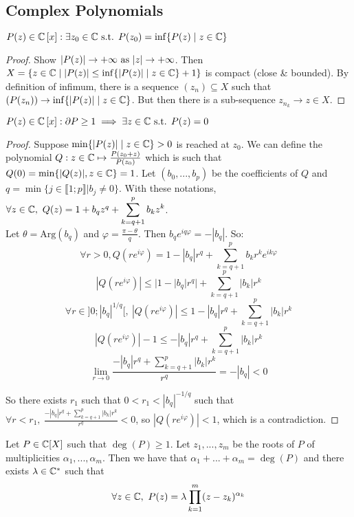 \subsection{Complex Polynomials}
\begin{lemma}
    $P(z) \in \mathbb{C}\left[ x \right]: \exists z_0 \in \mathbb{C} \text{ s.t. } P(z_0) = \inf\{ P(z) \mid z \in \mathbb{C} \}$
\end{lemma}
\begin{proof}
    Show $| P(z) | \to +\infty \text{ as } | z | \to +\infty$.
    Then $X = \{ z \in \mathbb{C} \mid | P(z) | \leq \inf\{ | P(z) | \mid z \in \mathbb{C} \}+1 \}$ is compact (close \& bounded).
    By definition of infimum, there is a sequence $(z_n) \subseteq X$ such that $(P(z_n)) \to \inf\{ | P(z) | \mid z \in \mathbb{C} \}$.
    But then there is a sub-sequence $z_{n_k} \to z \in X$.
\end{proof}

\begin{theorem}[of d'Alembert]
    $P(z) \in \mathbb{C}\left[ x \right]: \partial P \geq 1 \implies \exists z \in \mathbb{C} \text{ s.t. } P(z)=0$
\end{theorem}
\begin{proof}
    Suppose $\min\{ | P(z) | \mid z \in \mathbb{C} \}>0$ is reached at $z_0$.
    We can define the polynomial $Q:z\in \mathbb{C} \mapsto \frac{P(z_0+z)}{P(z_0)}$ which is such that $Q(0) = \min\{|Q(z)|,z\in \mathbb{C}\} = 1 $.
    Let $(b_0,...,b_p)$ be the coefficients of $Q$ and $q = \min\{ j \in \llbracket 1;p \rrbracket | b_j\neq 0\}$.
    With these notations, $\forall z\in \mathbb{C},~Q(z) = 1+b_qz^q + \displaystyle \sum_{k = q+1}^pb_kz^k$.\\
    Let $\theta = \mathrm{Arg}(b_q)$ and $\varphi = \frac{\pi-\theta}{q}$.
    Then $b_qe^{iq\varphi} =-|b_q|$.
    So:
    $$\forall r >0, Q(re^{i\varphi}) = 1-|b_q|r^q + \sum_{k = q+1}^p b_k r^k e^{ik\varphi}$$
    $$|Q(re^{i\varphi})| \leq |1-|b_q|r^q| + \sum_{k=q+1}^p |b_k|r^k$$
    $$\forall r \in ]0;|b_q|^{1/q}[,~ |Q(re^{i\varphi})|\leq 1-|b_q|r^q+ \sum_{k=q+1}^p |b_k|r^k$$
    $$|Q(re^{i\varphi})|-1\leq -|b_q|r^q+ \sum_{k=q+1}^p |b_k|r^k$$
    $$\lim_{r\rightarrow 0}\frac{-|b_q| r^q+\sum_{k = q+1}^p|b_k|r^k}{r^q} = -|b_q| <0$$
    
    So there exists $r_1$ such that $0 <r_1<|b_q|^{-1/q}$ such that $\forall r< r_1,~\displaystyle \frac{-|b_q| r^q+\sum_{k = q+1}^p|b_k|r^k}{r^q} <0$, so $|Q(re^{i\varphi})|<1$, which is a contradiction.
\end{proof}

\begin{corollary}
    Let $P\in \mathbb{C}[X]$ such that $\deg(P) \geq 1$. Let $z_1,...,z_m$ be the roots of $P$ of multiplicities $\alpha_1,...,\alpha_m$. Then we have that $\alpha_1+...+\alpha_m = \deg(P)$ and there exists $\lambda\in \mathbb{C}^*$ such that
    $$\forall z\in \mathbb{C},~P(z) = \lambda \prod_{k = 1}^m(z-z_k)^{\alpha_k}$$
\end{corollary}